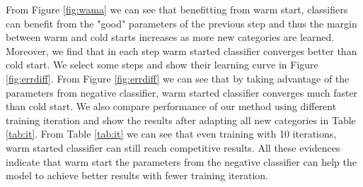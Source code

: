 From Figure \ref{fig:wama} we can see that benefitting from warm start, classifiers can benefit from the "good" parameters of the previous step and thus the margin between warm and cold starts increases as more new categories are learned.
Moreover, we find that in each step warm started classifier converges better than cold start. We select some steps and show their learning curve in Figure \ref{fig:errdiff}. From Figure \ref{fig:errdiff} we can see that by taking advantage of the parameters from negative classifier, warm started classifier converges much faster than cold start.
We also compare performance of our method using different training iteration and show the results after adapting all new categories in Table \ref{tab:it}. From Table \ref{tab:it} we can see that even training with 10 iterations, warm started classifier can still reach competitive results. All these evidences indicate that warm start the parameters from the negative classifier can help the model to achieve better results with fewer training iteration.

